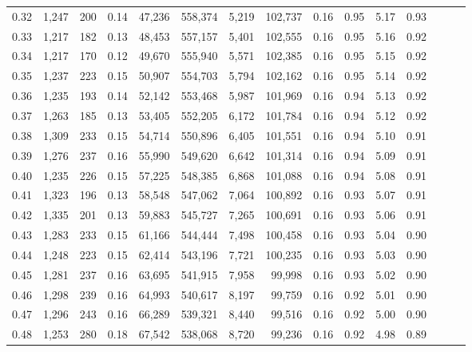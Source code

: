 \begin{tabular}{rrrrrrrrrrrrrrr}
0.32 &   1,247 &    200 &  0.14 &   47,236 &  558,374 &    5,219 &  102,737 &  0.16 &  0.95 &  5.17 &      0.93 \\
0.33 &   1,217 &    182 &  0.13 &   48,453 &  557,157 &    5,401 &  102,555 &  0.16 &  0.95 &  5.16 &      0.92 \\
0.34 &   1,217 &    170 &  0.12 &   49,670 &  555,940 &    5,571 &  102,385 &  0.16 &  0.95 &  5.15 &      0.92 \\
0.35 &   1,237 &    223 &  0.15 &   50,907 &  554,703 &    5,794 &  102,162 &  0.16 &  0.95 &  5.14 &      0.92 \\
0.36 &   1,235 &    193 &  0.14 &   52,142 &  553,468 &    5,987 &  101,969 &  0.16 &  0.94 &  5.13 &      0.92 \\
0.37 &   1,263 &    185 &  0.13 &   53,405 &  552,205 &    6,172 &  101,784 &  0.16 &  0.94 &  5.12 &      0.92 \\
0.38 &   1,309 &    233 &  0.15 &   54,714 &  550,896 &    6,405 &  101,551 &  0.16 &  0.94 &  5.10 &      0.91 \\
0.39 &   1,276 &    237 &  0.16 &   55,990 &  549,620 &    6,642 &  101,314 &  0.16 &  0.94 &  5.09 &      0.91 \\
0.40 &   1,235 &    226 &  0.15 &   57,225 &  548,385 &    6,868 &  101,088 &  0.16 &  0.94 &  5.08 &      0.91 \\
0.41 &   1,323 &    196 &  0.13 &   58,548 &  547,062 &    7,064 &  100,892 &  0.16 &  0.93 &  5.07 &      0.91 \\
0.42 &   1,335 &    201 &  0.13 &   59,883 &  545,727 &    7,265 &  100,691 &  0.16 &  0.93 &  5.06 &      0.91 \\
0.43 &   1,283 &    233 &  0.15 &   61,166 &  544,444 &    7,498 &  100,458 &  0.16 &  0.93 &  5.04 &      0.90 \\
0.44 &   1,248 &    223 &  0.15 &   62,414 &  543,196 &    7,721 &  100,235 &  0.16 &  0.93 &  5.03 &      0.90 \\
0.45 &   1,281 &    237 &  0.16 &   63,695 &  541,915 &    7,958 &   99,998 &  0.16 &  0.93 &  5.02 &      0.90 \\
0.46 &   1,298 &    239 &  0.16 &   64,993 &  540,617 &    8,197 &   99,759 &  0.16 &  0.92 &  5.01 &      0.90 \\
0.47 &   1,296 &    243 &  0.16 &   66,289 &  539,321 &    8,440 &   99,516 &  0.16 &  0.92 &  5.00 &      0.90 \\
0.48 &   1,253 &    280 &  0.18 &   67,542 &  538,068 &    8,720 &   99,236 &  0.16 &  0.92 &  4.98 &      0.89 \\

\end{tabular}
